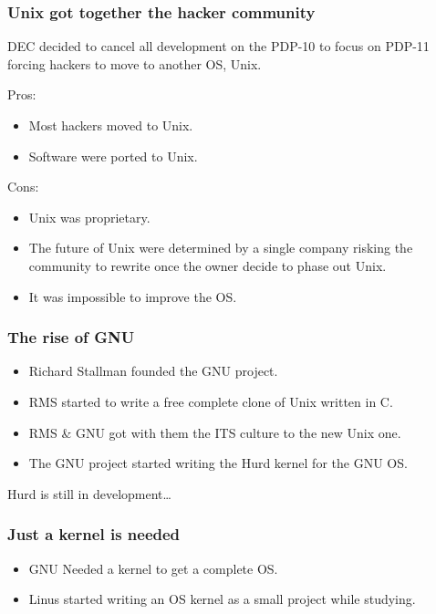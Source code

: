 \documentclass[hyperref={pdfpagelabels=false},xcolor=pst,pdf,fragile]{beamer}
\begin{document}
\begin{frame}
  \frametitle{Unix got together the hacker community}

  DEC decided to cancel all development on the PDP-10 to focus on PDP-11
  forcing hackers to move to another OS, Unix.

  \pause

  Pros:
  \begin{itemize}
	  \item Most hackers moved to Unix.
	  \item Software were ported to Unix.
  \end{itemize}

  \pause

  Cons:
  \begin{itemize}
	  \item Unix was proprietary.
	  \item The future of Unix were determined by a single company risking
		  the community to rewrite once the owner decide to phase out Unix.
	  \item It was impossible to improve the OS.
  \end{itemize}

\end{frame}

\begin{frame}
  \frametitle{The rise of GNU}

  \begin{itemize}
	  \item Richard Stallman founded the GNU project.
	  \item RMS started to write a \alert{free} complete clone of Unix written in C.
	  \item RMS \& GNU got with them the ITS culture to the new Unix one.
	  \item The GNU project started writing the Hurd kernel for the GNU OS.
  \end{itemize}

  \hskip-20pt
  \pause
  \begin{center}
	  Hurd is still in development\ldots
  \end{center}

\end{frame}

\begin{frame}
  \frametitle{Just a kernel is needed}

  \begin{itemize}
	  \item GNU Needed a kernel to get a complete OS.
	  \item Linus started writing an OS kernel as a small project while
		  studying.
  \end{itemize}

\end{frame}
\end{document}
